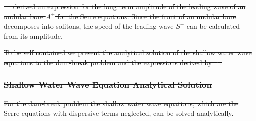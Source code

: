 \documentclass[times]{elsarticle}
\providecommand{\DIFdel}[1]{{\protect\color{red}\sout{#1}}}                      %
\providecommand{\DIFdelbegin}{} %
\begin{document}
\DIFdelbegin \DIFdel{\mbox{%
\citet{El-etal-2006} }%
derived an expression for the long term amplitude of the leading wave of an undular bore $A^+$ for the Serre equations. Since the front of an undular bore decomposes into solitons, the speed of the leading wave $S^+$ can be calculated from its amplitude.
}%

\DIFdel{To be self contained we present the analytical solution of the shallow water wave equations to the dam-break problem and the expressions derived by \mbox{%
\citet{El-etal-2006}}%
.
}%

\subsubsection{\DIFdel{Shallow Water Wave Equation Analytical Solution}}
\addtocounter{subsubsection}{-1}%
\DIFdel{For the dam-break problem the shallow water wave equations, which are the Serre equations with dispersive terms neglected, can be solved analytically. 
}%
\end{document}
